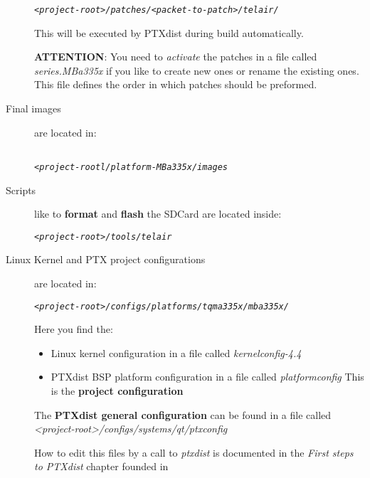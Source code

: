 \begin{description}
        \begin{alltt}
        \textit{<project-root>/patches/<packet-to-patch>/telair/}
        \end{alltt}

        This will be executed by PTXdist during build automatically.

        \textbf{ATTENTION}: You need to \textit{activate} the patches in a file
        called \textit{series.MBa335x} if you like to create new ones or rename
        the existing ones. This file defines the order in which patches should
        be preformed.

    \item[Final images] are located in:
        \begin{alltt}~\label{part:location_final_image}
        \textit{<project-rootl/platform-MBa335x/images}
        \end{alltt}
    \item[Scripts] like to \textbf{format} and \textbf{flash} the SDCard are
        located inside:
        \begin{alltt}
        \textit{<project-root>/tools/telair}
        \end{alltt}

    \item[Linux Kernel and PTX project configurations]are located in:
        \begin{alltt}
        \textit{<project-root>/configs/platforms/tqma335x/mba335x/}
        \end{alltt}
        Here you find the:
        \begin{itemize}
            \item Linux kernel configuration in a file called
        \textit{kernelconfig-4.4}

    \item PTXdist BSP platform configuration in a file
        called \textit{platformconfig} This is the
        \textbf{project configuration}
         \end{itemize}
        The \textbf{PTXdist general configuration} can be found in a file called
        \newline \textit{<project-root>/configs/systems/qt/ptxconfig}

         How to edit this files by a call to \textit{ptxdist} is documented in
         the \textit{First steps to PTXdist} chapter founded \newline
         in~\cite[PTXDist online documentation]{ptxdist_docu}


\end{description}
